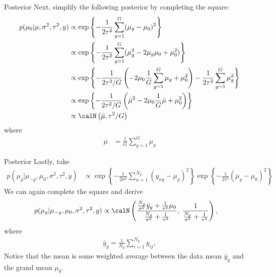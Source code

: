 \documentclass[aspectratio=169, handout]{beamer}
\begin{document}
{\footnotesize
\begin{frame}{Posterior}
Next, simplify the following posterior by completing the square:
\begin{align*}
  p(\mu_0|\mu,\sigma^2, \tau^2,y)
  &\propto
  \exp\left\{
    -
    \frac{1}{2\tau^2}
    \sum_{g=1}^G
    (\mu_g-\mu_0)^2
  \right\}
  \\
  &\propto
  \exp\left\{
    -
    \frac{1}{2\tau^2}
    \sum_{g=1}^G
    (\mu_g^2-2\mu_g\mu_0+ \mu_0^2)
  \right\}
  \\
  &\propto
  \exp\left\{
    -
    \frac{1}{2\tau^2/G}
    \left(-2\mu_0\frac{1}{G}\sum_{g=1}^G\mu_g + \mu_0^2\right)
    -
    \frac{1}{2\tau^2}
    \sum_{g=1}^G\mu_g^2
  \right\}
  \\
  &\propto
  \exp\left\{
    -
    \frac{1}{2\tau^2/G}
    \left(\bar{\mu}^2-2\mu_0\frac{1}{G}\bar{\mu} + \mu_0^2\right)
  \right\}
  \\
  &\propto
  \calN\left(
    \bar{\mu},\tau^2/G
  \right)
\end{align*}
where
\begin{align*}
  \bar{\mu}
  &=
  \frac{1}{G}
  \sum_{g=1}^G
  \mu_g
\end{align*}

\end{frame}
}

{\footnotesize
\begin{frame}{Posterior}
Lastly, take
\begin{align*}
  p(\mu_g|\mu_{-g},\mu_0,\sigma^2, \tau^2,y)
  &\propto
  \exp\left\{
    -
    \frac{1}{2\sigma^2}
    \sum_{n=1}^{N_g}
    (y_{ng}-\mu_g)^2
  \right\}
  \exp\left\{
    -
    \frac{1}{2\tau^2}
    (\mu_g-\mu_0)^2
  \right\}
\end{align*}
We can again complete the square and derive
\begin{align*}
    p(\mu_g | \mu_{-g}, \mu_0, \sigma^2, \tau^2, y)
    &\propto \calN\left(\frac{
      \frac{N_g}{\sigma^2} \bar{y}_g
      + \frac{1}{\tau^2}\mu_0}{\frac{N_g}{\sigma^2} + \frac{1}{\tau^2}},
      \; \frac{1}{ \frac{N_g}{\sigma^2} + \frac{1}{\tau^2}} \right),
\end{align*}
where
\begin{align*}
  \bar{y}_g = \frac{1}{N_g} \sum^{N_g}_{i=1} y_{ij},
\end{align*}
Notice that the mean is some weighted average between the data mean
$\bar{y}_g$ and the grand mean $\mu_0$.
\end{frame}
}
\end{document}
